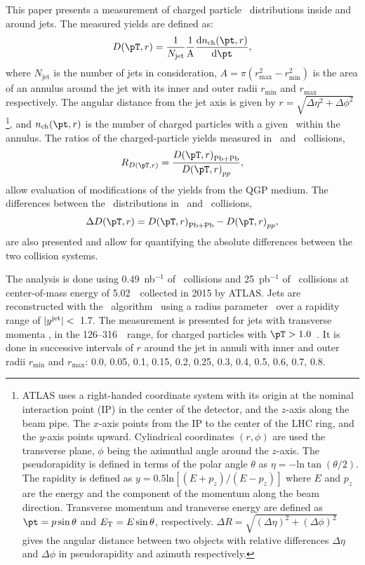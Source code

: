 This paper presents a measurement of charged particle \pt\ distributions inside and around jets. The measured yields are defined as:
  \begin{align*}
  \Dptr = \frac{1}{N_{\mathrm{jet}}} \frac{1}{\mathrm{A}} \frac{\mathrm{d} n_{\mathrm{ch}} (\pt, r)}{\mathrm{d} \pt},
\end{align*}
where $N_{\mathrm{jet}}$ is the number of jets in consideration, $A = \pi (r_{\mathrm{max}}^2 - r_{\mathrm{min}}^2) $ is the area of an annulus around the jet with its inner and outer radii $r_{\mathrm{min}}$ and $r_{\mathrm{max}}$ respectively. The angular distance from the jet axis is given by $r = \sqrt{\Delta \eta^2 + \Delta \phi^2}$ \footnote{ATLAS uses a right-handed coordinate system with its origin at the nominal interaction point (IP) in the center of the detector, and the $z$-axis along the beam pipe. The $x$-axis points from the IP to the center of the LHC ring, and the $y$-axis points upward. Cylindrical coordinates $(r, \phi)$ are used the transverse plane, $\phi$ being the azimuthal angle around the $z$-axis. The pseudorapidity is defined in terms of the polar angle $\theta$ as $\eta = - \text{ln} \tan (\theta/2)$. The rapidity is defined as $y = 0.5\text{ln}[(E + p_z)/(E-p_z)]$ where $E$ and $p_z$ are the energy and the component of the momentum along the beam direction.  Transverse momentum and transverse energy are defined as $\pt = p \sin\theta$ and $\mbox{$E_{\mathrm{T}}$} = E \sin\theta$, respectively. $\Delta R = \sqrt{(\Delta \eta )^2 + (\Delta \phi)^2}$ gives the angular distance between two objects with relative differences $\Delta \eta$ and $\Delta \phi$ in pseudorapidity and azimuth respectively.}, and $n_{\mathrm{ch}}(\pt, r)$ is the number of charged particles with a given \pt\ within the annulus. The ratios of the charged-particle yields measured in \pbpb\ and \pp\ collisions,
\begin{align*}
   \RDptr = \frac{\Dptr_\mathrm{Pb+Pb}}{\Dptr_{pp}},
\end{align*}
allow evaluation of modifications of the yields from the QGP medium. The differences between the \Dptr\ distributions in \pbpb\ and \pp\ collisions, 
\begin{align*}
   \Delta \Dptr = \Dptr_\mathrm{Pb+Pb} - \Dptr_{pp},
\end{align*}
 are also presented and allow for quantifying the absolute differences between the two collision systems. 

The analysis is done using 0.49~nb$^{-1}$ of \pbpb\ collisions and 
25~pb$^{-1}$ of \pp\ collisions at center-of-mass energy of 5.02~\TeV\ collected in 2015 by ATLAS.
Jets are reconstructed with the \antikt\ algorithm~\cite{Cacciari:2008qp} using a radius parameter \RFour\ over a rapidity range of $|\mbox{$y^{\mathrm{jet}}$}| <$~1.7. The measurement is presented for jets with transverse momenta \ptjet, in the 126--316~\GeV\ range, for charged particles with $\pT>1.0$~\GeV. It is done in successive intervals of $r$ around the jet in annuli with inner and outer radii $r_{\textrm{min}}$ and $r_{\textrm{max}}$: 0.0, 0.05, 0.1, 0.15, 0.2, 0.25, 0.3, 0.4, 0.5, 0.6, 0.7, 0.8.


